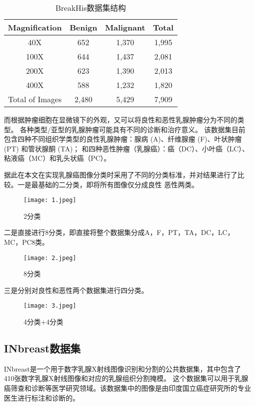 \documentclass[AutoFakeBold]{LZUThesis}
\begin{document}
\begin{table}[H]
    \centering
    \caption{BreakHis数据集结构}
    \begin{tabular}{|c|c|c|c|} %
    \hline
    Magnification & Benign & Malignant & Total\\
    \hline
    40X & 652 & 1,370 & 1,995\\
    \hline
    100X & 644 & 1,437 & 2,081\\
    \hline
    200X & 623 & 1,390 & 2,013\\
    \hline
    400X & 588 & 1,232 & 1,820\\
    \hline
    Total of Images & 2,480 & 5,429 & 7,909\\
    \hline
    \end{tabular}
    \label{tbl_mos1_nanotube}



\end{table}

而根据肿瘤细胞在显微镜下的外观，又可以将良性和恶性乳腺肿瘤分为不同的类型。
各种类型/亚型的乳腺肿瘤可能具有不同的诊断和治疗意义。
该数据集目前包含四种不同组织学类型的良性乳腺肿瘤：腺病 (A)、纤维腺瘤 (F)、叶状肿瘤 (PT) 和管状腺酮 (TA)；
和四种恶性肿瘤（乳腺癌）：癌（DC）、小叶癌（LC）、粘液癌（MC）和乳头状癌（PC）。
 
据此在本文在实现乳腺癌图像分类时采用了不同的分类标准，并对结果进行了比较。一是最基础的二分类，即将所有图像仅分成良性
恶性两类。

\begin{figure}[H]
    \centering
    \texttt{[image: 1.jpeg]}
    \caption{2分类}
    \label{figure}
 \end{figure}
  

二是直接进行8分类，即直接将整个数据集分成A，F，PT，TA，DC，LC，MC，PC8类。

\begin{figure}[H]
    \centering
    \texttt{[image: 2.jpeg]}
    \caption{8分类}
    \label{figure}
 \end{figure}


三是分别对良性和恶性两个数据集进行四分类。

\begin{figure}[H]
    \centering
    \texttt{[image: 3.jpeg]}
    \caption{4分类+4分类}
    \label{figure}
 \end{figure}


\subsection{INbreast数据集}
INbreast是一个用于数字乳腺X射线图像识别和分割的公共数据集，其中包含了410张数字乳腺X射线图像和对应的乳腺组织分割掩模。
这个数据集可以用于乳腺癌筛查和诊断等医学研究领域。该数据集中的图像是由印度国立癌症研究所的专业医生进行标注和诊断的。
\end{document}
